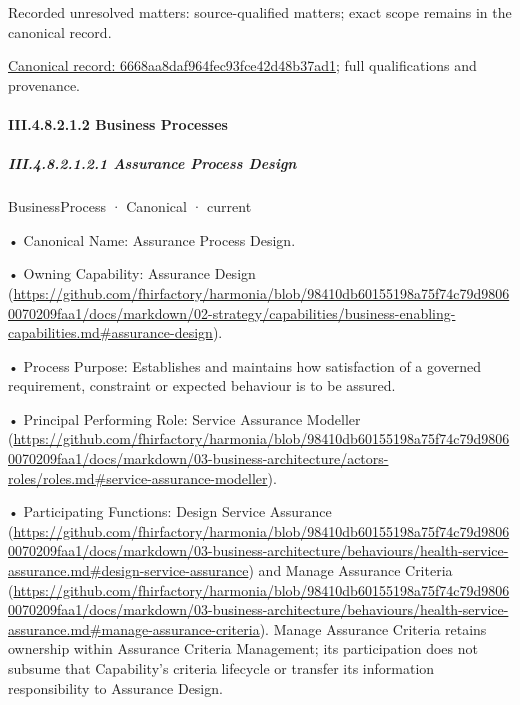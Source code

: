 {\small Recorded unresolved matters: source-qualified matters; exact scope remains in the canonical record.}\par
{\footnotesize \href{../../../../../../../continuum/business/business-function/6668aa8daf964fec93fce42d48b37ad1.md}{Canonical record: 6668aa8daf964fec93fce42d48b37ad1}; full qualifications and provenance.}\par
\paragraph*{III.4.8.2.1.2 Business Processes}
\label{navigation:III.4.8.2.1.2}

\subparagraph*{III.4.8.2.1.2.1 Assurance Process Design}
\label{navigation:III.4.8.2.1.2.1}

\label{element:aec3177dcdd84961814f2ba4f688ad33}
{\small BusinessProcess · Canonical · current}\par

•
Canonical Name: Assurance Process Design.



•
Owning Capability: Assurance Design (\url{https://github.com/fhirfactory/harmonia/blob/98410db60155198a75f74c79d98060070209faa1/docs/markdown/02-strategy/capabilities/business-enabling-capabilities.md#assurance-design}).



•
Process Purpose: Establishes and maintains how satisfaction of a governed requirement, constraint or expected behaviour is to be assured.



•
Principal Performing Role: Service Assurance Modeller (\url{https://github.com/fhirfactory/harmonia/blob/98410db60155198a75f74c79d98060070209faa1/docs/markdown/03-business-architecture/actors-roles/roles.md#service-assurance-modeller}).



•
Participating Functions: Design Service Assurance (\url{https://github.com/fhirfactory/harmonia/blob/98410db60155198a75f74c79d98060070209faa1/docs/markdown/03-business-architecture/behaviours/health-service-assurance.md#design-service-assurance}) and Manage Assurance Criteria (\url{https://github.com/fhirfactory/harmonia/blob/98410db60155198a75f74c79d98060070209faa1/docs/markdown/03-business-architecture/behaviours/health-service-assurance.md#manage-assurance-criteria}). Manage Assurance Criteria retains ownership within Assurance Criteria Management; its participation does not subsume that Capability's criteria lifecycle or transfer its information responsibility to Assurance Design.



